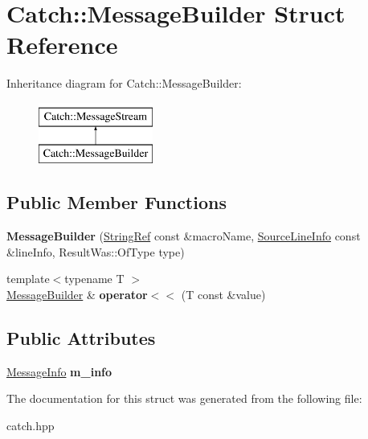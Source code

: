 \hypertarget{struct_catch_1_1_message_builder}{}\section{Catch\+:\+:Message\+Builder Struct Reference}
\label{struct_catch_1_1_message_builder}
Inheritance diagram for Catch\+:\+:Message\+Builder\+:\begin{figure}[H]
\begin{center}
\leavevmode
\includegraphics[height=2.000000cm]{struct_catch_1_1_message_builder}
\end{center}
\end{figure}
\subsection*{Public Member Functions}
\begin{DoxyCompactItemize}
\item 
\mbox{\label{struct_catch_1_1_message_builder_ac34832ca527a758f000ac233d32dd068}} 
{\bfseries Message\+Builder} (\mbox{\hyperlink{class_catch_1_1_string_ref}{String\+Ref}} const \&macro\+Name, \mbox{\hyperlink{struct_catch_1_1_source_line_info}{Source\+Line\+Info}} const \&line\+Info, Result\+Was\+::\+Of\+Type type)
\item 
\mbox{\label{struct_catch_1_1_message_builder_a20fa48d069b20dddcc2d3df8abb123c1}} 
{\footnotesize template$<$typename T $>$ }\\\mbox{\hyperlink{struct_catch_1_1_message_builder}{Message\+Builder}} \& {\bfseries operator$<$$<$} (T const \&value)
\end{DoxyCompactItemize}
\subsection*{Public Attributes}
\begin{DoxyCompactItemize}
\item 
\mbox{\label{struct_catch_1_1_message_builder_a979f1c2b36d78f80ee275bfa5ba0209f}} 
\mbox{\hyperlink{struct_catch_1_1_message_info}{Message\+Info}} {\bfseries m\+\_\+info}
\end{DoxyCompactItemize}


The documentation for this struct was generated from the following file\+:\begin{DoxyCompactItemize}
\item 
catch.\+hpp\end{DoxyCompactItemize}
